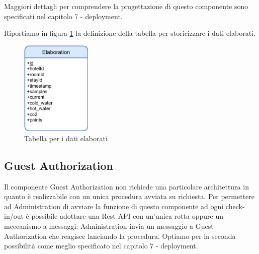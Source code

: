 Maggiori dettagli per comprendere la progettazione di questo componente sono specificati nel capitolo 7 - deployment.

Riportiamo in figura \ref*{er-elaboration} la definizione della tabella per storicizzare i dati elaborati.

\begin{figure}[H]
    \begin{center}
        \includegraphics[width=0.3\textwidth]{images/er-elaboration.png}
    \end{center}
    \caption{\label{er-elaboration} Tabella per i dati elaborati}
\end{figure}

\newpage

\subsection{Guest Authorization}

Il componente Guest Authorization non richiede una particolare architettura in quanto è realizzabile con un unica procedura avviata su richiesta.
Per permettere ad Administration di avviare la funzione di questo componente ad ogni check-in/out è possibile adottare una Rest API con un'unica rotta 
oppure un meccanismo a messaggi: Administration invia un messaggio a Guest Authorization che reagisce lanciando la procedura.
Optiamo per la seconda possibilità come meglio specificato nel capitolo 7 - deployment.
